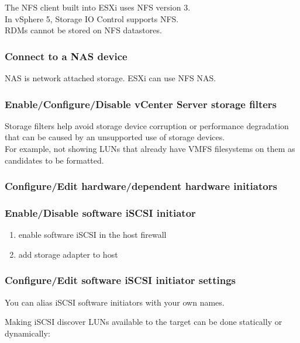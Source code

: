 The NFS client built into ESXi uses NFS version 3.\\

In vSphere 5, Storage IO Control supports NFS.\\

RDMs cannot be stored on NFS datastores.

\subsubsection{Connect to a NAS device}

NAS is network attached storage. ESXi can use NFS NAS.

\subsubsection{Enable/Configure/Disable vCenter Server storage filters}

Storage filters help avoid storage device corruption or performance
degradation that can be caused by an unsupported use of storage devices.\\

For example, not showing LUNs that already have VMFS filesystems on them
as candidates to be formatted.

\subsubsection{Configure/Edit hardware/dependent hardware initiators}

\subsubsection{Enable/Disable software iSCSI initiator}

\begin{enumerate}
\item enable software iSCSI in the host firewall
\item add storage adapter to host
\end{enumerate}

\subsubsection{Configure/Edit software iSCSI initiator settings}

You can alias iSCSI software initiators with your own names.

Making iSCSI discover LUNs available to the target can be done statically
or dynamically:

